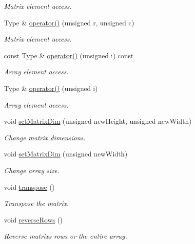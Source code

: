 \begin{DoxyCompactItemize}
\begin{DoxyCompactList}\small\item\em Matrix element access. \end{DoxyCompactList}\item 
Type \& \mbox{\hyperlink{classMatrix2D_a448fd38c905dd2879244ac345c76b14e}{operator()}} (unsigned r, unsigned c)
\begin{DoxyCompactList}\small\item\em Matrix element access. \end{DoxyCompactList}\item 
const Type \& \mbox{\hyperlink{classMatrix2D_ac5b60589d9d867150e045887aaebe5b0}{operator()}} (unsigned i) const
\begin{DoxyCompactList}\small\item\em Array element access. \end{DoxyCompactList}\item 
Type \& \mbox{\hyperlink{classMatrix2D_afebec0a3fc73a157fe8044416fb6d0b3}{operator()}} (unsigned i)
\begin{DoxyCompactList}\small\item\em Array element access. \end{DoxyCompactList}\item 
void \mbox{\hyperlink{classMatrix2D_abf7025332a5f4f75b172fb1a3ad56176}{set\+Matrix\+Dim}} (unsigned new\+Height, unsigned new\+Width)
\begin{DoxyCompactList}\small\item\em Change matrix dimensions. \end{DoxyCompactList}\item 
void \mbox{\hyperlink{classMatrix2D_a02d8df2be95d08423b44009ffe01c12f}{set\+Matrix\+Dim}} (unsigned new\+Width)
\begin{DoxyCompactList}\small\item\em Change array size. \end{DoxyCompactList}\item 
void \mbox{\hyperlink{classMatrix2D_a788abe5e1fbd6a1fbd0d445aca4f8300}{transpose}} ()
\begin{DoxyCompactList}\small\item\em Transpose the matrix. \end{DoxyCompactList}\item 
void \mbox{\hyperlink{classMatrix2D_aaaefe293f1a0549afb2e506b71b18490}{reverse\+Rows}} ()
\begin{DoxyCompactList}\small\item\em Reverse matrix\textquotesingle{}s rows or the entire array. \end{DoxyCompactList}\item 

\end{DoxyCompactItemize}
